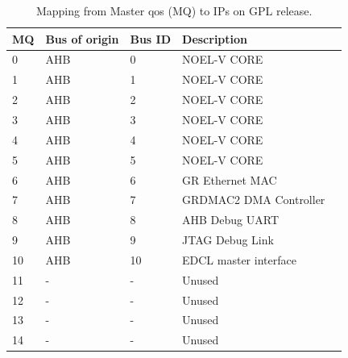 \begin{table}[H]
	\caption{Mapping from Master qos (MQ) to IPs on GPL release. }
	\label{table:t_ev2}
	\centering
		\begin{tabular}{|l|l|l|l|l|}
			\hline
			\textbf{MQ} & \textbf{Bus of origin}  & \textbf{Bus ID} & \textbf{Description}\\
			\hline
0 & AHB & 0 &  NOEL-V CORE \\
1 & AHB & 1 &  NOEL-V CORE \\
2 & AHB & 2 &  NOEL-V CORE \\
3 & AHB & 3 &  NOEL-V CORE \\
4 & AHB & 4 &  NOEL-V CORE \\
5 & AHB & 5 &  NOEL-V CORE \\
6 & AHB & 6 &  GR Ethernet MAC \\
7 & AHB & 7 &  GRDMAC2 DMA Controller \\
8 & AHB & 8 &  AHB Debug UART \\
9 & AHB & 9 &  JTAG Debug Link \\
10 & AHB & 10 &  EDCL master interface   \\
11 & - & - & Unused \\
12 & - & - & Unused  \\
13 & - & - & Unused   \\
14 & - & - & Unused  \\
	\hline
		\end{tabular}
\end{table}

